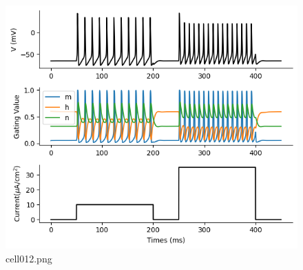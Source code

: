 \begin{figure}[ht]
	\centering
	\includegraphics[scale=0.8, max width=\linewidth]{./fig/neuron-model/hodgkin-huxley/cell012.png}
	\caption{cell012.png}
	\label{cell012.png}
\end{figure}